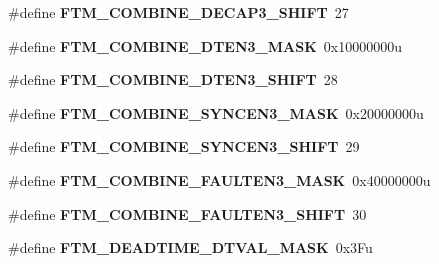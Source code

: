 \begin{DoxyCompactItemize}
\item 
\#define {\bfseries F\+T\+M\+\_\+\+C\+O\+M\+B\+I\+N\+E\+\_\+\+D\+E\+C\+A\+P3\+\_\+\+S\+H\+I\+FT}~27\hypertarget{group__FTM__Register__Masks_ga691e558585a939559f4588bea64c099d}{}\label{group__FTM__Register__Masks_ga691e558585a939559f4588bea64c099d}

\item 
\#define {\bfseries F\+T\+M\+\_\+\+C\+O\+M\+B\+I\+N\+E\+\_\+\+D\+T\+E\+N3\+\_\+\+M\+A\+SK}~0x10000000u\hypertarget{group__FTM__Register__Masks_ga53beef0d6bd400f7d10dff07a8e95802}{}\label{group__FTM__Register__Masks_ga53beef0d6bd400f7d10dff07a8e95802}

\item 
\#define {\bfseries F\+T\+M\+\_\+\+C\+O\+M\+B\+I\+N\+E\+\_\+\+D\+T\+E\+N3\+\_\+\+S\+H\+I\+FT}~28\hypertarget{group__FTM__Register__Masks_ga0534a71643db31f180f6918d19ad3409}{}\label{group__FTM__Register__Masks_ga0534a71643db31f180f6918d19ad3409}

\item 
\#define {\bfseries F\+T\+M\+\_\+\+C\+O\+M\+B\+I\+N\+E\+\_\+\+S\+Y\+N\+C\+E\+N3\+\_\+\+M\+A\+SK}~0x20000000u\hypertarget{group__FTM__Register__Masks_ga9e631b38ed9e6cbf3a3afa812db96c21}{}\label{group__FTM__Register__Masks_ga9e631b38ed9e6cbf3a3afa812db96c21}

\item 
\#define {\bfseries F\+T\+M\+\_\+\+C\+O\+M\+B\+I\+N\+E\+\_\+\+S\+Y\+N\+C\+E\+N3\+\_\+\+S\+H\+I\+FT}~29\hypertarget{group__FTM__Register__Masks_ga429ad5d8c1f8afa7450531c8c0d6421d}{}\label{group__FTM__Register__Masks_ga429ad5d8c1f8afa7450531c8c0d6421d}

\item 
\#define {\bfseries F\+T\+M\+\_\+\+C\+O\+M\+B\+I\+N\+E\+\_\+\+F\+A\+U\+L\+T\+E\+N3\+\_\+\+M\+A\+SK}~0x40000000u\hypertarget{group__FTM__Register__Masks_ga2f56f45afa6694ded2489432d0be896f}{}\label{group__FTM__Register__Masks_ga2f56f45afa6694ded2489432d0be896f}

\item 
\#define {\bfseries F\+T\+M\+\_\+\+C\+O\+M\+B\+I\+N\+E\+\_\+\+F\+A\+U\+L\+T\+E\+N3\+\_\+\+S\+H\+I\+FT}~30\hypertarget{group__FTM__Register__Masks_ga85e6b9e11f73ef2ae12870399dbc99a6}{}\label{group__FTM__Register__Masks_ga85e6b9e11f73ef2ae12870399dbc99a6}

\item 
\#define {\bfseries F\+T\+M\+\_\+\+D\+E\+A\+D\+T\+I\+M\+E\+\_\+\+D\+T\+V\+A\+L\+\_\+\+M\+A\+SK}~0x3\+Fu\hypertarget{group__FTM__Register__Masks_ga8fdaa69c3721ec4a328fadcc00d4f4df}{}\label{group__FTM__Register__Masks_ga8fdaa69c3721ec4a328fadcc00d4f4df}


\end{DoxyCompactItemize}
